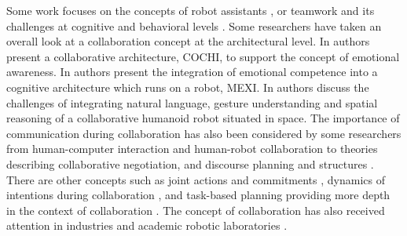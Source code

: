 \documentclass[12pt]{report}
\begin{document}
Some work focuses on the concepts of robot assistants
\cite{clancey:agent-assistants-collaboration}, or teamwork and its challenges at
cognitive and behavioral levels \cite{nikolaidis:collaboration-joint-action,
scerri:prototype-distributed-teams}. Some researchers have taken an overall look
at a collaboration concept at the architectural level. In
\cite{garcia:collaboration-emotional-awareness} authors present a collaborative
architecture, COCHI, to support the concept of emotional awareness. In
\cite{esau:integrating-emotion-collaboration} authors present the integration of
emotional competence into a cognitive architecture which runs on a robot, MEXI.
In \cite{sofge:collaboration-humanoid-space} authors discuss the challenges of
integrating natural language, gesture understanding and spatial reasoning of a
collaborative humanoid robot situated in space. The importance of communication
during collaboration has also been considered by some researchers from
human-computer interaction and human-robot collaboration
\cite{clair:action-intention-collaboraiton,
matignon:verbal-nonverbal-collaboration, rich:discourse} to theories describing
collaborative negotiation, and discourse planning and structures
\cite{andriessen:disourse-planning, grosz:discourse-structure,
sidner:discourse-collaborative-negotiation}. There are other concepts such as
joint actions and commitments \cite{grosz:intention-dynamics-collaboration},
dynamics of intentions during collaboration \cite{levesque:acting-together}, and
task-based planning providing more depth in the context of collaboration
\cite{burghart:cognitive-architecture-robot, rich:cea}. The concept of
collaboration has also received attention in industries and academic robotic
laboratories \cite{green:collaboration-literature-review}.
\end{document}
